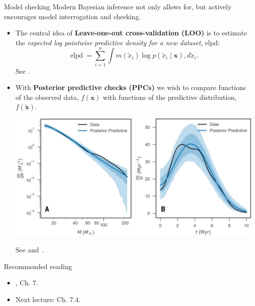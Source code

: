 \begin{frame}{Model checking}
Modern Bayesian inference not only allows for, but actively encourages model interrogation and checking.
\begin{itemize}
 \item The central idea of \textbf{Leave-one-out cross-validation (LOO)} is to estimate the \textit{expected log pointwise predictive density for a new dataset}, elpd:
 \begin{equation*}
  \operatorname{elpd} = \sum_{i=1}^n \int m(\tilde{x}_i)\log p(\tilde{x}_i \mid \boldsymbol{x}),d\tilde{x}_i.
 \end{equation*}
 See \cite{Vehtari2017}.
 \item With \textbf{Posterior predictive checks (PPCs)} we wish to compare  functions of the observed data, $f(\boldsymbol{x})$ with functions of the predictive distribution, $f(\boldsymbol{\tilde{x}})$.
  \begin{center}
 \includegraphics[scale=0.5]{figures/PPC.jpg}
\end{center}
 See \cite{Berkhof2000} and~\cite{Gabry2019}.
\end{itemize}
\end{frame}
\begin{frame}{Recommended reading}
\begin{itemize}
  \item[\faBook] \cite{Robert2007}, Ch. 7.
 \item[\faForward] Next lecture: \cite{Schervish1995} Ch. 7.4.
 \end{itemize} 
\end{frame}
